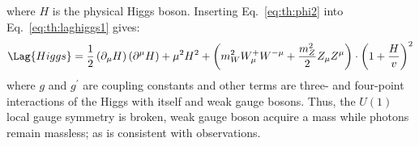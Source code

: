 where $H$ is the physical Higgs boson.
Inserting Eq.~\ref{eq:th:phi2} into Eq.~\ref{eq:th:laghiggs1} gives:
\begin{equation}
  \Lag{Higgs} =
  \frac12\left(\partial_\mu H\right)\left(\partial^\mu H\right)
  +\mu^2H^2
  +\left(m_W^2W_\mu^+W^{-\mu} + \frac{m_Z^2}{2}Z_\mu Z^\mu\right)
  \cdot
  \left(1 + \frac{H}{v}\right)^2
  \label{eq:th:laghiggs2}
\end{equation}
where $g$ and $g^\prime$ are coupling constants and other terms are three- and four-point
interactions of the Higgs with itself and weak gauge bosons.
Thus, the $U(1)$ local gauge symmetry is broken, weak gauge boson acquire a mass while photons remain
massless; as is consistent with observations.


